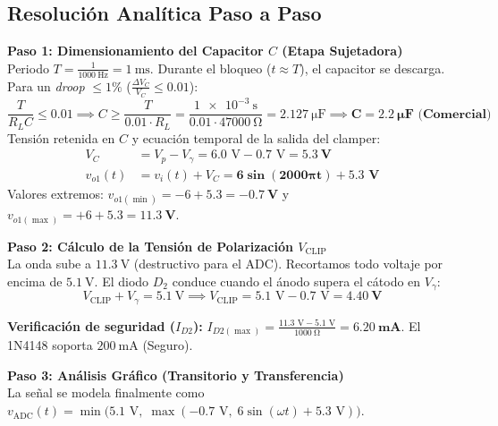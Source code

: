 \documentclass[11pt, a4paper]{article}
\begin{document}
\subsection*{Resolución Analítica Paso a Paso}
\textbf{Paso 1: Dimensionamiento del Capacitor $C$ (Etapa Sujetadora)}\\
Periodo $T = \frac{1}{\qty{1000}{\hertz}} = \qty{1}{\milli\second}$. Durante el bloqueo ($t \approx T$), el capacitor se descarga. Para un \textit{droop} $\le 1\%$ ($\frac{\Delta V_C}{V_C} \le 0.01$):
\begin{equation*}
    \frac{T}{R_L C} \le 0.01 \implies C \ge \frac{T}{0.01 \cdot R_L} = \frac{\qty{1e-3}{\second}}{0.01 \cdot \qty{47000}{\ohm}} = \qty{2.127}{\micro\farad} \implies \mathbf{C = \qty{2.2}{\micro\farad} \text{ (Comercial)}}
\end{equation*}
Tensión retenida en $C$ y ecuación temporal de la salida del clamper:
\begin{align*}
    V_C &= V_p - V_\gamma = 6.0\text{ V} - 0.7\text{ V} = \mathbf{\qty{5.3}{\volt}} \\
    v_{o1}(t) &= v_i(t) + V_C = \mathbf{6 \sin(2000\pi t) + 5.3\text{ V}}
\end{align*}
Valores extremos: $v_{o1(\min)} = -6 + 5.3 = \mathbf{\qty{-0.7}{\volt}}$ y $v_{o1(\max)} = +6 + 5.3 = \mathbf{\qty{+11.3}{\volt}}$.

\vspace{0.3cm}
\noindent \textbf{Paso 2: Cálculo de la Tensión de Polarización $V_{\text{CLIP}}$}\\
La onda sube a $\qty{+11.3}{\volt}$ (destructivo para el ADC). Recortamos todo voltaje por encima de $\qty{+5.1}{\volt}$. El diodo $D_2$ conduce cuando el ánodo supera el cátodo en $V_\gamma$:
\begin{equation*}
    V_{\text{CLIP}} + V_\gamma = \qty{5.1}{\volt} \implies V_{\text{CLIP}} = 5.1\text{ V} - 0.7\text{ V} = \mathbf{\qty{4.40}{\volt}}
\end{equation*}

\noindent \textbf{Verificación de seguridad ($I_{D2}$):} $I_{D2(\max)} = \frac{11.3\text{ V} - 5.1\text{ V}}{\qty{1000}{\ohm}} = \mathbf{\qty{6.20}{\milli\ampere}}$. El 1N4148 soporta $\qty{200}{\milli\ampere}$ (Seguro).

\vspace{0.3cm}
\noindent \textbf{Paso 3: Análisis Gráfico (Transitorio y Transferencia)}\\
La señal se modela finalmente como $v_{\text{ADC}}(t) = \min\Big(5.1\text{ V}, \; \max(-0.7\text{ V}, \; 6\sin(\omega t) + 5.3\text{ V})\Big)$.
\end{document}

